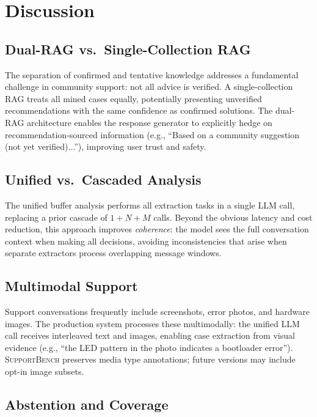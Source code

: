 \documentclass[11pt]{article}
\newcommand{\supportbench}{\textsc{SupportBench}}
\begin{document}
\section{Discussion}

\subsection{Dual-RAG vs.\ Single-Collection RAG}

The separation of confirmed and tentative knowledge addresses a fundamental challenge in community support: not all advice is verified. A single-collection RAG treats all mined cases equally, potentially presenting unverified recommendations with the same confidence as confirmed solutions. The dual-RAG architecture enables the response generator to explicitly hedge on recommendation-sourced information (e.g., ``Based on a community suggestion (not yet verified)...''), improving user trust and safety.

\subsection{Unified vs.\ Cascaded Analysis}

The unified buffer analysis performs all extraction tasks in a single LLM call, replacing a prior cascade of $1 + N + M$ calls. Beyond the obvious latency and cost reduction, this approach improves \emph{coherence}: the model sees the full conversation context when making all decisions, avoiding inconsistencies that arise when separate extractors process overlapping message windows.

\subsection{Multimodal Support}

Support conversations frequently include screenshots, error photos, and hardware images. The production system processes these multimodally: the unified LLM call receives interleaved text and images, enabling case extraction from visual evidence (e.g., ``the LED pattern in the photo indicates a bootloader error''). \supportbench{} preserves media type annotations; future versions may include opt-in image subsets.

\subsection{Abstention and Coverage}
\end{document}
